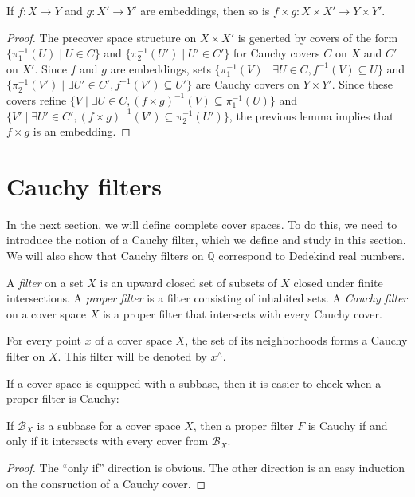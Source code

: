 \documentclass[reqno]{amsart}
\theoremstyle{definition}
\theoremstyle{remark}
\numberwithin{figure}{section}
\begin{document}
\begin{lem}
If $f : X \to Y$ and $g : X' \to Y'$ are embeddings, then so is $f \times g : X \times X' \to Y \times Y'$.
\end{lem}
\begin{proof}
The precover space structure on $X \times X'$ is generted by covers of the form $\{ \pi_1^{-1}(U) \mid U \in C \}$ and $\{ \pi_2^{-1}(U') \mid U' \in C' \}$ for Cauchy covers $C$ on $X$ and $C'$ on $X'$.
Since $f$ and $g$ are embeddings, sets $\{ \pi_1^{-1}(V) \mid \exists U \in C, f^{-1}(V) \subseteq U \}$ and $\{ \pi_2^{-1}(V') \mid \exists U' \in C', f^{-1}(V') \subseteq U' \}$ are Cauchy covers on $Y \times Y'$.
Since these covers refine $\{ V \mid \exists U \in C, (f \times g)^{-1}(V) \subseteq \pi_1^{-1}(U) \}$ and $\{ V' \mid \exists U' \in C', (f \times g)^{-1}(V') \subseteq \pi_2^{-1}(U') \}$, the previous lemma implies that $f \times g$ is an embedding.
\end{proof}

\section{Cauchy filters}

In the next section, we will define complete cover spaces.
To do this, we need to introduce the notion of a Cauchy filter, which we define and study in this section.
We will also show that Cauchy filters on $\mathbb{Q}$ correspond to Dedekind real numbers.

\begin{defn}
A \emph{filter} on a set $X$ is an upward closed set of subsets of $X$ closed under finite intersections.
A \emph{proper filter} is a filter consisting of inhabited sets.
A \emph{Cauchy filter} on a cover space $X$ is a proper filter that intersects with every Cauchy cover.
\end{defn}

\begin{example}
For every point $x$ of a cover space $X$, the set of its neighborhoods forms a Cauchy filter on $X$.
This filter will be denoted by $x^\wedge$.
\end{example}

If a cover space is equipped with a subbase, then it is easier to check when a proper filter is Cauchy:

\begin{prop}
If $\mathcal{B}_X$ is a subbase for a cover space $X$, then a proper filter $F$ is Cauchy if and only if it intersects with every cover from $\mathcal{B}_X$.
\end{prop}
\begin{proof}
The ``only if'' direction is obvious.
The other direction is an easy induction on the consruction of a Cauchy cover.
\end{proof}
\end{document}
